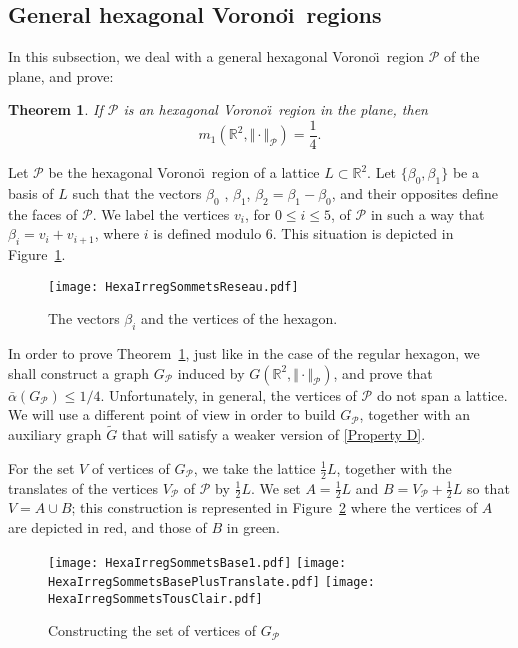 \documentclass{amsart}                     %
\newtheorem{theo}{Theorem}
\newcommand{\R}{{\mathbb R}}
\newcommand{\tref}[1]{Theorem~\textup{\ref{#1}}}
\newcommand{\fref}[1]{Figure~\textup{\ref{#1}}}
\begin{document}
\subsection{General hexagonal Vorono\"\i\  regions}\label{SoussecHexaIrreg}

In this subsection, we deal with a general hexagonal Vorono\"\i\  region $\mathcal P$ of the plane, and prove:

\begin{theo}\label{HexaIrregTheo}
If $\mathcal{P}$ is an hexagonal Vorono\"\i\  region in the plane, then
$$m_1(\R^2,\Vert   \cdot\Vert  _\mathcal{P})=\frac{1}{4}.$$
\end{theo}


Let $\mathcal{P}$ be the hexagonal Vorono\"\i\  region of a lattice $L\subset \R^2$. 
Let $\{\beta_0,\beta_1\}$ be a basis of $L$ such that the vectors $\beta_0$ , $\beta_1$, $\beta_2=\beta_1 - \beta_0$, and their opposites define the faces of $\mathcal{P}$.
We label the vertices $v_i$, for $0\leq i\leq 5$, of $\mathcal{P}$ in such a way that $\beta_i=v_i + v_{i+1}$, where $i$ is defined modulo $6$. This situation is depicted in \fref{SituationHexaIrreg}.

\begin{figure}[!ht]
\texttt{[image: HexaIrregSommetsReseau.pdf]}
\caption{The vectors $\beta_i$ and the vertices of the hexagon.\label{SituationHexaIrreg}}
\end{figure}


In order to prove \tref{HexaIrregTheo}, just like in the case of the regular hexagon, we shall construct a graph $G_\mathcal{P}$ induced by $G(\R^2, \Vert\cdot\Vert_\mathcal{P})$, and prove that $\bar{\alpha}(G_\mathcal{P})\leq 1/4$. 
Unfortunately, in  general, the vertices of $\mathcal{P}$ do not span a lattice. We will use a different point of view in order to build $G_\mathcal{P}$, together with an auxiliary graph $\tilde{G}$ that will satisfy a weaker version of \eqref{Property D}.

For the set $V$ of vertices of $G_{\mathcal P}$, we take the lattice  $\frac{1}{2}L$, 
together with the  translates of  the vertices $V_{\mathcal P}$ of $\mathcal{P}$ by  $\frac{1}{2}L$. 
We set $A=\frac{1}{2}L$ and $B=V_{\mathcal P}+\frac{1}{2}L$ so that $V=A\cup B$;  this construction is represented in \fref{HexaIrregSommets}
where the vertices of $A$ are depicted in red, and those of $B$ in green.

\begin{figure}[!ht]
\texttt{[image: HexaIrregSommetsBase1.pdf]} 
\hspace{.3cm}
\texttt{[image: HexaIrregSommetsBasePlusTranslate.pdf]} 
\hspace{.3cm}
\texttt{[image: HexaIrregSommetsTousClair.pdf]}
\caption{Constructing the set of vertices of $G_\mathcal{P}$}\label{HexaIrregSommets}
\end{figure}
\end{document}
